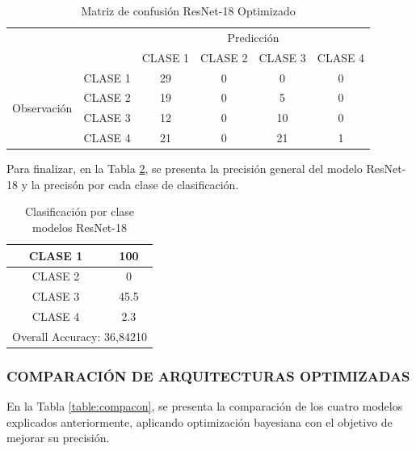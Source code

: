 	\newpage
		\begin{table}[htbp]
			\centering
			\begin{tabular}{|c|l|c|c|c|c|}
				\hline
				\multicolumn{2}{|c|}{\multirow{2}[4]{*}{}} & \multicolumn{4}{c|}{Predicción} \bigstrut\\
				\cline{3-6}    \multicolumn{2}{|c|}{} & CLASE 1 & CLASE 2 & CLASE 3 & CLASE 4 \bigstrut\\
				\hline
				\multirow{4}[8]{*}{\begin{sideways}Observación\end{sideways}} & CLASE 1 & 29     & 0     & 0    & 0 \bigstrut\\
				\cline{2-6}          & CLASE 2 & 19     & 0     & 5    & 0 \bigstrut\\
				\cline{2-6}          & CLASE 3 & 12     & 0     & 10    & 0 \bigstrut\\
				\cline{2-6}          & CLASE 4 & 21     & 0     & 21    & 1 \bigstrut\\
				\hline
			\end{tabular}%
			\caption{Matriz de confusión ResNet-18 Optimizado }
			\label{tab:MC_resnet_OPT}%
		\end{table}%
	Para finalizar, en la Tabla \ref{tab:resnetoptclases}, se presenta la precisión general del modelo ResNet-18 y la precisón por cada clase de clasificación.
		\begin{table}[htbp]
			\centering
			\begin{tabular}{|c|c|}
				\hline
				CLASE 1 & 100 \bigstrut\\
				\hline
				CLASE 2 & 0 \bigstrut\\
				\hline
				CLASE 3 & 45.5 \bigstrut\\
				\hline
				CLASE 4 & 2.3 \bigstrut\\
				\hline
				\multicolumn{2}{|c|}{Overall Accuracy: 36,84210} \bigstrut\\
				\hline
			\end{tabular}%
			\caption{Clasificación por clase modelos ResNet-18}
			\label{tab:resnetoptclases}%
		\end{table}%
	
	
	\subsubsection{\MakeUppercase{Comparación de Arquitecturas Optimizadas}}
		
		En la Tabla \ref{table:compacon}, se presenta la comparación de los cuatro modelos explicados anteriormente, aplicando optimización bayesiana con el objetivo de mejorar su precisión.
		
